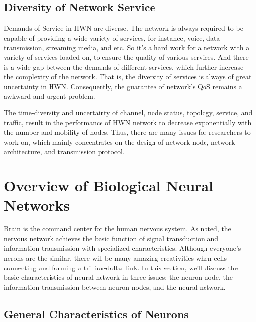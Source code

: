 \documentclass[journal,comsoc]{IEEEtran}
\begin{document}
		\subsection{Diversity of Network Service}
			Demands of Service in HWN are diverse. 
			The network is always required to be capable of providing a wide variety of services, for instance, voice, data transmission, streaming media, and etc.
			So it's a hard work for a network with a variety of services loaded on, to ensure the quality of various services.
			And there is a wide gap between the demands of different services, which further increase the complexity of the network.
			That is, the diversity of services is always of great uncertainty in HWN.
			Consequently, the guarantee of network's QoS remains a awkward and urgent problem.
			
			The time-diversity and uncertainty of channel, node status, topology, service, and traffic, 
			result in the performance of HWN network to decrease exponentially with the number and mobility of nodes.
			Thus, there are many issues for researchers to work on, 
			which mainly concentrates on the design of network node, network architecture, and transmission protocol.
	
	\section{Overview of Biological Neural Networks}
	\label{section: information_transmit}
		Brain is the command center for the human nervous system\cite{hart1983human}.
		As \cite{rsheng} noted, the nervous network achieves the basic function of signal transduction and information transmission with specialized characteristics.
		Although everyone's nerons are the similar, there will be many amazing creativities when cells connecting and forming a trillion-dollar link.
		In this section, we'll discuss the basic characteristics of neural network in three issues: the neuron node, the  information transmission between neuron nodes, and the neural network.
		
		\subsection{General Characteristics of Neurons}
		
\end{document}
